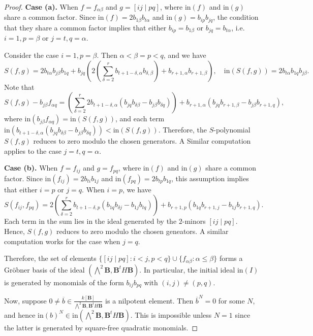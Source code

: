 \documentclass[pdflatex,sn-mathphys-num]{sn-jnl}%
\theoremstyle{thmstyleone}%
\theoremstyle{thmstyletwo}%
\numberwithin{equation}{subsection}
\theoremstyle{thmstylethree}%
\newcommand{\bB}{\ensuremath{\mathbf{B}}\xspace}
\DeclareMathOperator{\Spec}{Spec}
\newcommand{\ov}{\overline}
\newcommand{\ini}{\text{in}}
\begin{document}
\begin{proof}
\noindent\textbf{Case (a).} 
When $f=f_{\alpha\beta}$ and $g=[ij\mid pq]$, where $\ini(f)$ and $\ini(g)$ share a  common factor.
Since $\ini(f)=2b_{1\beta}b_{t\alpha}$ and $\ini(g)=b_{ip}b_{jq}$, the condition that they share a common factor implies that either $b_{ip}=b_{1\beta}$ or $b_{jq}=b_{t\alpha}$, i.e. $i=1,p=\beta$ or $j=t,q=\alpha$.

Consider the case $i=1,p=\beta$. Then $\alpha<\beta=p<q$, and we have
\begin{equation*}
    S(f,g)=2b_{t\alpha} b_{j\beta}b_{1q}+b_{jq}\left(2\left(\sum_{\delta=2}^r b_{t+1-\delta,\alpha}b_{\delta,\beta}\right)+b_{r+1,\alpha}b_{r+1,\beta}\right),
    \quad
    \ini(S(f,g))=2b_{t\alpha}b_{1q}b_{j\beta}.
\end{equation*}
Note that
\begin{equation*}
    S(f,g)-b_{j\beta}f_{\alpha q}=
    \left(\sum_{\delta=2}^r 2b_{t+1-\delta,\alpha}(b_{jq}b_{\delta\beta}-b_{j\beta}b_{\delta q})\right)+b_{r+1,\alpha}(b_{jq}b_{r+1,\beta}-b_{j\beta}b_{r+1,q}),
\end{equation*}
where $\ini(b_{j\beta}f_{\alpha q})=\ini(S(f,g))$, and each term $\ini(b_{t+1-\delta,\alpha}(b_{jq}b_{\delta\beta}-b_{j\beta}b_{\delta q}))<\ini(S(f,g))$.
Therefore, the $S$-polynomial $S(f,g)$ reduces to zero modulo the chosen generators.
A Similar computation applies to the case $j=t, q=\alpha$.

\noindent\textbf{Case (b).} When $f=f_{ij}$ and $g=f_{pq}$, where $\ini(f)$ and $\ini(g)$ share a common factor.
Since $\ini(f_{ij})=2b_{ti}b_{1j}$ and $\ini(f_{pq})=2b_{tp}b_{1q}$, this assumption implies that either $i=p$ or $j=q$.
When $i=p$, we have
\begin{equation*}
    S(f_{ij},f_{pq})=2\left(\sum_{\delta=2}^r b_{t+1-\delta,p}(b_{1q}b_{\delta j}-b_{1j}b_{tq})\right)+b_{r+1,p}(b_{1q}b_{r+1,j}-b_{1j}b_{r+1,q}).
\end{equation*}
Each term in the sum lies in the ideal generated by the $2$-minors $[ij \mid pq]$.
Hence, $S(f,g)$ reduces to zero modulo the chosen geneators.
A similar computation works for the case when $j=q$.

Therefore, the set of elements $\{[ij\mid pq]:i<j,p<q\}\cup\{f_{\alpha\beta}:\alpha\leq \beta\}$ forms a Gr\"obner basis of the ideal $\left(\bigwedge^2\bB,\bB^tH\bB\right)$. In particular, the initial ideal $\ini(I)$ is generated by monomials of the form $b_{ij}b_{pq}$ with $(i,j)\neq (p,q)$. 

Now, suppose $0\neq \ov{b}\in \frac{k[\bB]}{\bigwedge^2 \bB,\bB^tH\bB}$ is a nilpotent element.
Then $\ov{b}^N=0$ for some $N$, and hence $\ini(b)^N\in \ini\left(\bigwedge^2\bB,\bB^tH\bB\right)$. This is impossible unless $N=1$ since the latter is generated by square-free quadratic monomials.
\end{proof}
\end{document}
